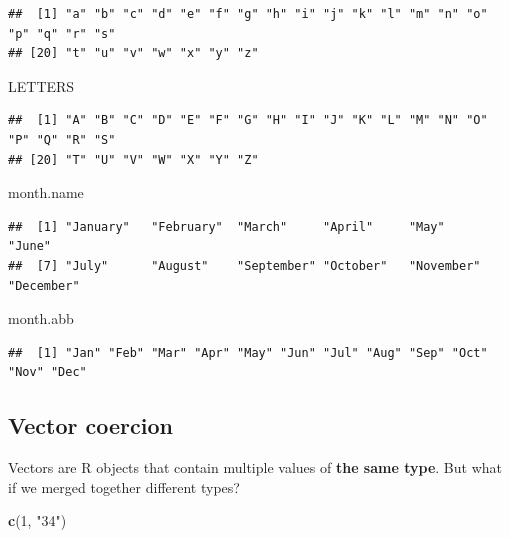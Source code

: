 \documentclass[
]{book}
\newenvironment{Shaded}{\begin{snugshade}}{\end{snugshade}}
\newcommand{\DecValTok}[1]{\textcolor[rgb]{0.00,0.00,0.81}{#1}}
\newcommand{\KeywordTok}[1]{\textcolor[rgb]{0.13,0.29,0.53}{\textbf{#1}}}
\newcommand{\NormalTok}[1]{#1}
\newcommand{\StringTok}[1]{\textcolor[rgb]{0.31,0.60,0.02}{#1}}
\begin{document}
\begin{verbatim}
##  [1] "a" "b" "c" "d" "e" "f" "g" "h" "i" "j" "k" "l" "m" "n" "o" "p" "q" "r" "s"
## [20] "t" "u" "v" "w" "x" "y" "z"
\end{verbatim}

\begin{Shaded}
\begin{Highlighting}[]
\NormalTok{LETTERS}
\end{Highlighting}
\end{Shaded}

\begin{verbatim}
##  [1] "A" "B" "C" "D" "E" "F" "G" "H" "I" "J" "K" "L" "M" "N" "O" "P" "Q" "R" "S"
## [20] "T" "U" "V" "W" "X" "Y" "Z"
\end{verbatim}

\begin{Shaded}
\begin{Highlighting}[]
\NormalTok{month.name}
\end{Highlighting}
\end{Shaded}

\begin{verbatim}
##  [1] "January"   "February"  "March"     "April"     "May"       "June"     
##  [7] "July"      "August"    "September" "October"   "November"  "December"
\end{verbatim}

\begin{Shaded}
\begin{Highlighting}[]
\NormalTok{month.abb}
\end{Highlighting}
\end{Shaded}

\begin{verbatim}
##  [1] "Jan" "Feb" "Mar" "Apr" "May" "Jun" "Jul" "Aug" "Sep" "Oct" "Nov" "Dec"
\end{verbatim}

\hypertarget{vector-coercion}{%
\subsection{Vector coercion}\label{vector-coercion}}

Vectors are R objects that contain multiple values of \textbf{the same type}. But what if we merged together different types?

\begin{Shaded}
\begin{Highlighting}[]
\KeywordTok{c}\NormalTok{(}\DecValTok{1}\NormalTok{, }\StringTok{"34"}\NormalTok{)}
\end{Highlighting}
\end{Shaded}
\end{document}
